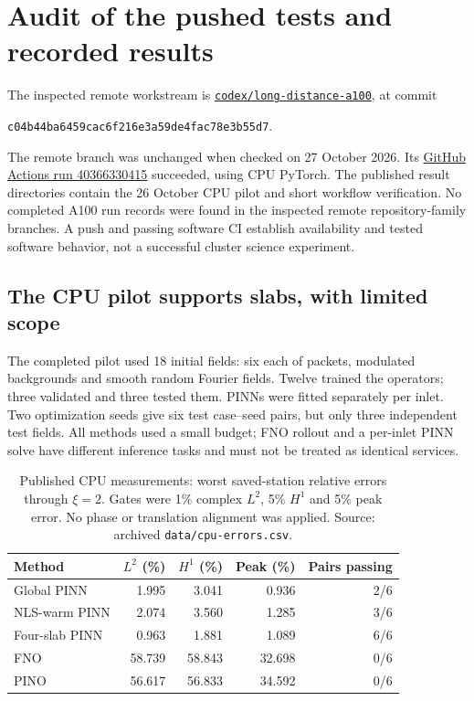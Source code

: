 \documentclass[11pt]{article}
\begin{document}
\section{Audit of the pushed tests and recorded results}
The inspected remote workstream is
\href{https://github.com/matasvai/dysthe-experiments/tree/codex/long-distance-a100}{\texttt{codex/long-distance-a100}},
at commit
\begin{center}\small\texttt{c04b44ba6459cac6f216e3a59de4fac78e3b55d7}.\end{center}
The remote branch was unchanged when checked on 27 October 2026. Its
\href{https://github.com/matasvai/dysthe-experiments/actions/runs/40366330415}{GitHub Actions run 40366330415}
succeeded, using CPU PyTorch. The published result directories contain the
26 October CPU pilot and short workflow verification. No completed A100 run
records were found in the inspected remote repository-family branches. A push
and passing software CI establish availability and tested software behavior,
not a successful cluster science experiment.

\subsection{The CPU pilot supports slabs, with limited scope}
The completed pilot used 18 initial fields: six each of packets, modulated
backgrounds and smooth random Fourier fields. Twelve trained the operators;
three validated and three tested them. PINNs were fitted separately per inlet.
Two optimization seeds give six test case--seed pairs, but only three independent
test fields. All methods used a small budget; FNO rollout and a per-inlet PINN
solve have different inference tasks and must not be treated as identical services.

\begin{table}[h]\centering\small
\begin{tabular}{lrrrr}\toprule
Method & $L^2$ (\%) & $H^1$ (\%) & Peak (\%) & Pairs passing\\\midrule
Global PINN & 1.995 & 3.041 & 0.936 & 2/6\\
NLS-warm PINN & 2.074 & 3.560 & 1.285 & 3/6\\
Four-slab PINN & 0.963 & 1.881 & 1.089 & 6/6\\
FNO & 58.739 & 58.843 & 32.698 & 0/6\\
PINO & 56.617 & 56.833 & 34.592 & 0/6\\\bottomrule
\end{tabular}
\caption{Published CPU measurements: worst saved-station relative errors through
$\xi=2$. Gates were 1\% complex $L^2$, 5\% $H^1$ and 5\% peak error.
No phase or translation alignment was applied. Source: archived
\texttt{data/cpu-errors.csv}.}
\end{table}
\end{document}
